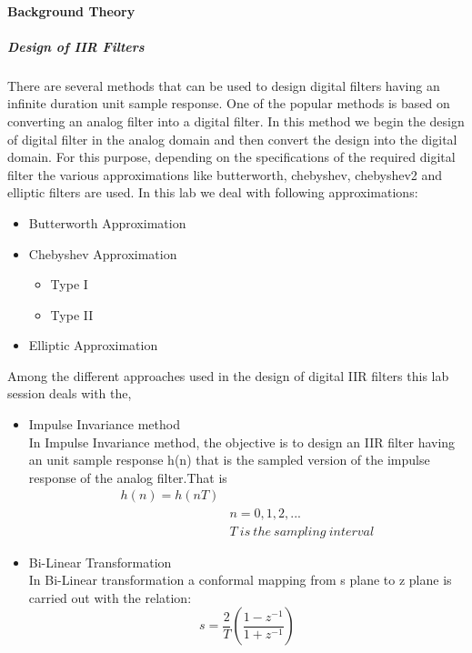 \documentclass[12pt]{article}
\begin{document}
\paragraph{Background Theory}
\subparagraph{Design of IIR Filters\\}
There are several methods that can be used to design digital filters having an infinite duration
unit sample response. One of the popular methods is based on converting an analog filter into a
digital filter. In this method we begin the design of digital filter in the analog domain and then
convert the design into the digital domain. For this purpose, depending on the specifications of
the required digital filter the various approximations like butterworth, chebyshev, chebyshev2
and elliptic filters are used. In this lab we deal with following approximations:
\begin{itemize}
    \item Butterworth Approximation
    \item Chebyshev Approximation
    \begin{itemize}
        \item Type I
        \item Type II
    \end{itemize}
    \item Elliptic Approximation
\end{itemize}
Among the different approaches used in the design of digital IIR filters this lab session deals
with the,
\begin{itemize}
    \item Impulse Invariance method\\
    In Impulse Invariance method, the objective is to design an IIR filter having an unit sample
response h(n) that is the sampled version of the impulse response of the analog filter.That is 
\begin{equation}
    \begin{aligned}
        h(n) = h(nT)&\\
        &n = 0,1,2,...\\
        &T \ is \ the \ sampling \ interval
    \end{aligned}
\end{equation}
    \item Bi-Linear Transformation\\
    In Bi-Linear transformation a conformal mapping from s plane to z plane is carried out with the
relation:
\begin{equation}
    s = \frac{2}{T}(\frac{1-z^{-1}}{1+z^{-1}})
\end{equation}
\end{itemize}
\end{document}
